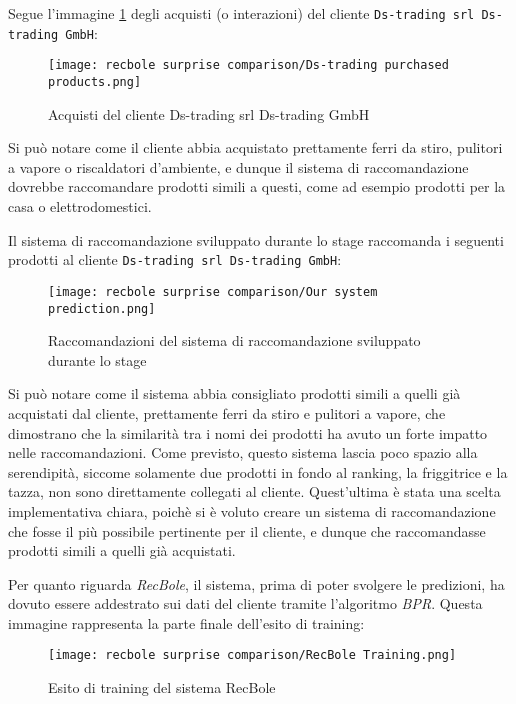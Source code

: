 Segue l'immagine \ref{fig:recbole-surprise-orders-export} degli acquisti (o interazioni) del cliente \texttt{Ds-trading srl Ds-trading GmbH}:

\begin{figure}[h]
    \centering
    \texttt{[image: recbole surprise comparison/Ds-trading purchased products.png]}
    \caption{Acquisti del cliente Ds-trading srl Ds-trading GmbH}
    \label{fig:recbole-surprise-orders-export}
\end{figure}

Si può notare come il cliente abbia acquistato prettamente ferri da stiro, pulitori a vapore o riscaldatori d'ambiente, e dunque il sistema di raccomandazione dovrebbe raccomandare prodotti simili a questi, come ad esempio prodotti per la casa o elettrodomestici.

Il sistema di raccomandazione sviluppato durante lo stage raccomanda i seguenti prodotti al cliente \texttt{Ds-trading srl Ds-trading GmbH}:

\begin{figure}[h]
    \centering
    \texttt{[image: recbole surprise comparison/Our system prediction.png]}
    \caption{Raccomandazioni del sistema di raccomandazione sviluppato durante lo stage}
    \label{fig:our-system-recommendations}
\end{figure}

Si può notare come il sistema abbia consigliato prodotti simili a quelli già acquistati dal cliente, prettamente ferri da stiro e pulitori a vapore, che dimostrano che la similarità tra i nomi dei prodotti ha avuto un forte impatto nelle raccomandazioni. Come previsto, questo sistema lascia poco spazio alla serendipità, siccome solamente due prodotti in fondo al ranking, la friggitrice e la tazza, non sono direttamente collegati al cliente. Quest'ultima è stata una scelta implementativa chiara, poichè si è voluto creare un sistema di raccomandazione che fosse il più possibile pertinente per il cliente, e dunque che raccomandasse prodotti simili a quelli già acquistati.

Per quanto riguarda \emph{RecBole}, il sistema, prima di poter svolgere le predizioni, ha dovuto essere addestrato sui dati del cliente tramite l'algoritmo \emph{BPR}. Questa immagine rappresenta la parte finale dell'esito di training:

\begin{figure}[h]
    \centering
    \texttt{[image: recbole surprise comparison/RecBole Training.png]}
    \caption{Esito di training del sistema RecBole}
    \label{fig:recbole-training-outcome}
\end{figure}

